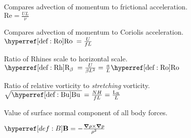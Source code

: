 \begin{multicols}{3}

\begin{definition} \label{def:Re}
Compares advection of momentum to frictional acceleration.\\
$\mathrm{Re} = \frac{U L}{\nu}$
 \end{definition}


\begin{definition} \label{def:Ro}
Compares advection of momentum to Coriolis acceleration.\\
$\Ro = \frac{U }{f L}$
 \end{definition}


\begin{definition}\label{def:Rh}
Ratio of Rhines scale to horizontal scale.\\
$\Rh = \frac{U }{\beta L^2} = \frac{a}{L} \Ro$
  \end{definition}



\begin{definition}\label{def:Bu}
Ratio of relative vorticity to \textit{stretching} vorticity.\\
$\sqrt{\Bu}=\frac{N H}{f L}=\frac{\mathrm{L_R}}{L}$
 \end{definition}


\begin{definition} \label{def:m}
\end{definition}

\begin{definition} \label{def:g}
Value of surface normal component of all body forces.
\end{definition}


\begin{definition} \label{def:vort}
\end{definition}


\begin{definition} \label{def:B }
$\B= -\frac{ \grad \rho 	\times \grad p}{ \rho^{2}} $
\end{definition}


\end{multicols}
